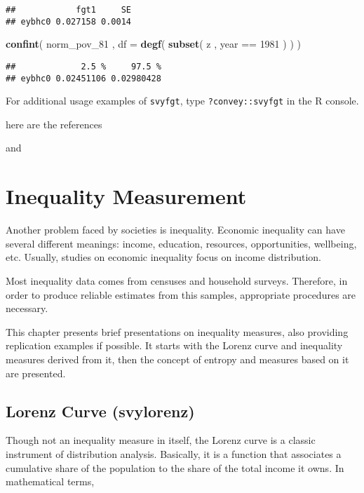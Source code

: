 \documentclass[]{book}
\newenvironment{Shaded}{\begin{snugshade}}{\end{snugshade}}
\newcommand{\KeywordTok}[1]{\textcolor[rgb]{0.13,0.29,0.53}{\textbf{{#1}}}}
\newcommand{\DataTypeTok}[1]{\textcolor[rgb]{0.13,0.29,0.53}{{#1}}}
\newcommand{\DecValTok}[1]{\textcolor[rgb]{0.00,0.00,0.81}{{#1}}}
\newcommand{\StringTok}[1]{\textcolor[rgb]{0.31,0.60,0.02}{{#1}}}
\newcommand{\NormalTok}[1]{{#1}}
\begin{document}
\begin{verbatim}
##            fgt1     SE
## eybhc0 0.027158 0.0014
\end{verbatim}

\begin{Shaded}
\begin{Highlighting}[]
\KeywordTok{confint}\NormalTok{( norm_pov_81 , }\DataTypeTok{df =} \KeywordTok{degf}\NormalTok{( }\KeywordTok{subset}\NormalTok{( z , year ==}\StringTok{ }\DecValTok{1981} \NormalTok{) ) )}
\end{Highlighting}
\end{Shaded}

\begin{verbatim}
##             2.5 %     97.5 %
## eybhc0 0.02451106 0.02980428
\end{verbatim}

For additional usage examples of \texttt{svyfgt}, type
\texttt{?convey::svyfgt} in the R console.

here are the references

\citep{foster1984} and \citep{berger2003}

\chapter{Inequality Measurement}\label{inequality}

Another problem faced by societies is inequality. Economic inequality
can have several different meanings: income, education, resources,
opportunities, wellbeing, etc. Usually, studies on economic inequality
focus on income distribution.

Most inequality data comes from censuses and household surveys.
Therefore, in order to produce reliable estimates from this samples,
appropriate procedures are necessary.

This chapter presents brief presentations on inequality measures, also
providing replication examples if possible. It starts with the Lorenz
curve and inequality measures derived from it, then the concept of
entropy and measures based on it are presented.

\section{Lorenz Curve (svylorenz)}\label{lorenz-curve-svylorenz}

Though not an inequality measure in itself, the Lorenz curve is a
classic instrument of distribution analysis. Basically, it is a function
that associates a cumulative share of the population to the share of the
total income it owns. In mathematical terms,
\end{document}
